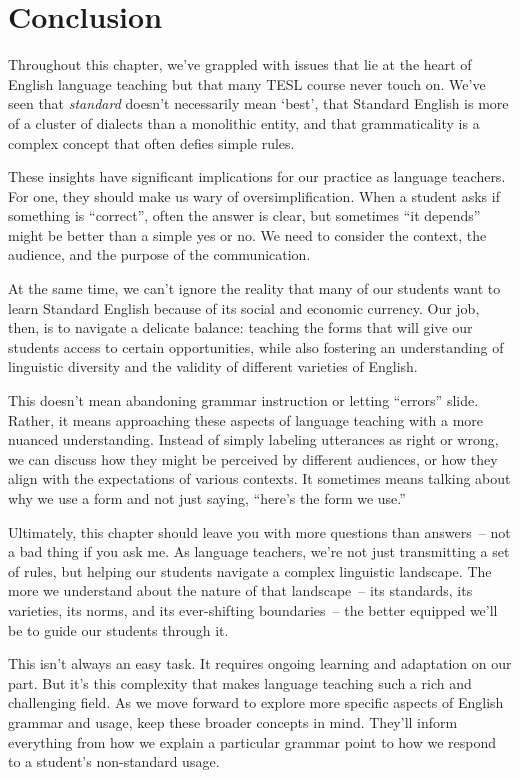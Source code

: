 \section{Conclusion}

Throughout this chapter, we've grappled with issues that lie at the heart of English language teaching but that many TESL course never touch on. We've seen that \textit{standard} doesn't necessarily mean `best', that Standard English is more of a cluster of dialects than a monolithic entity, and that grammaticality is a complex concept that often defies simple rules.

These insights have significant implications for our practice as language teachers. For one, they should make us wary of oversimplification. When a student asks if something is ``correct'', often the answer is clear, but sometimes ``it depends'' might be better than a simple yes or no. We need to consider the context, the audience, and the purpose of the communication.

At the same time, we can't ignore the reality that many of our students want to learn Standard English because of its social and economic currency. Our job, then, is to navigate a delicate balance: teaching the forms that will give our students access to certain opportunities, while also fostering an understanding of linguistic diversity and the validity of different varieties of English.

This doesn't mean abandoning grammar instruction or letting ``errors'' slide. Rather, it means approaching these aspects of language teaching with a more nuanced understanding. Instead of simply labeling utterances as right or wrong, we can discuss how they might be perceived by different audiences, or how they align with the expectations of various contexts. It sometimes means talking about why we use a form and not just saying, ``here's the form we use.''

Ultimately, this chapter should leave you with more questions than answers~-- not a bad thing if you ask me. As language teachers, we're not just transmitting a set of rules, but helping our students navigate a complex linguistic landscape. The more we understand about the nature of that landscape~-- its standards, its varieties, its norms, and its ever-shifting boundaries~-- the better equipped we'll be to guide our students through it.

This isn't always an easy task. It requires ongoing learning and adaptation on our part. But it's this complexity that makes language teaching such a rich and challenging field. As we move forward to explore more specific aspects of English grammar and usage, keep these broader concepts in mind. They'll inform everything from how we explain a particular grammar point to how we respond to a student's non-standard usage.
\newpage

